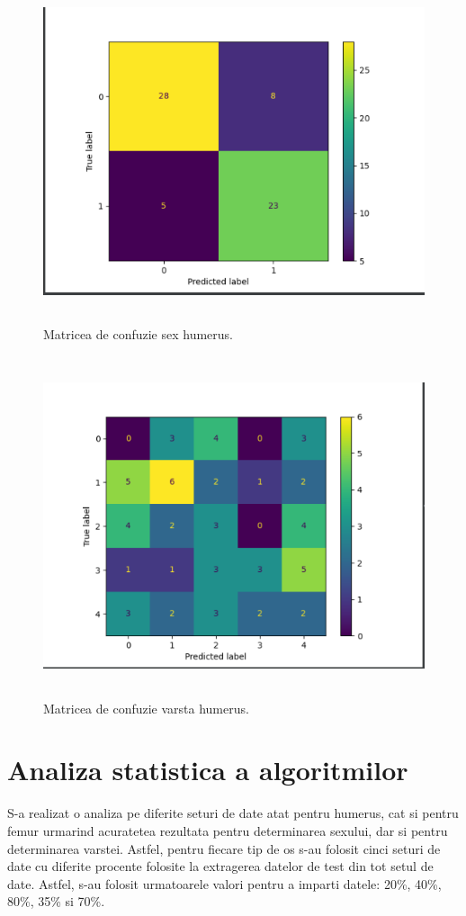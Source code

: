 \documentclass[runningheads,a4paper,11pt]{report}
\begin{document}
\begin{figure}
    \centering
    \includegraphics[height=10cm]{Imagini/matrice_confuzie_sex_arbore.PNG}
    \caption{Matricea de confuzie sex humerus.}
    \label{matrice_confuzie_sex}
\end{figure}

\begin{figure}
    \centering
    \includegraphics[height=10cm]{Imagini/matrice_confuzie_varsta_arbore_decizie.png}
    \caption{Matricea de confuzie varsta humerus.}
    \label{matrice_confuzie_varsta}
\end{figure}

\chapter{Analiza statistica a algoritmilor}
\label{anaizaStatistica}
S-a realizat o analiza pe diferite seturi de date atat pentru humerus, cat si pentru femur urmarind acuratetea rezultata pentru determinarea sexului, dar si pentru determinarea varstei. Astfel, pentru fiecare tip de os s-au folosit cinci seturi de date cu diferite procente folosite la extragerea datelor de test din tot setul de date. Astfel, s-au folosit urmatoarele valori pentru a imparti datele: 20\%, 40\%, 80\%, 35\% si 70\%.
\end{document}

